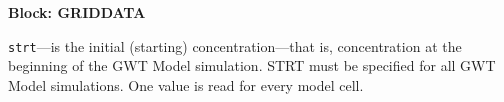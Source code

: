 
\item \textbf{Block: GRIDDATA}

\begin{description}
\item \texttt{strt}---is the initial (starting) concentration---that is, concentration at the beginning of the GWT Model simulation.  STRT must be specified for all GWT Model simulations. One value is read for every model cell.

\end{description}

